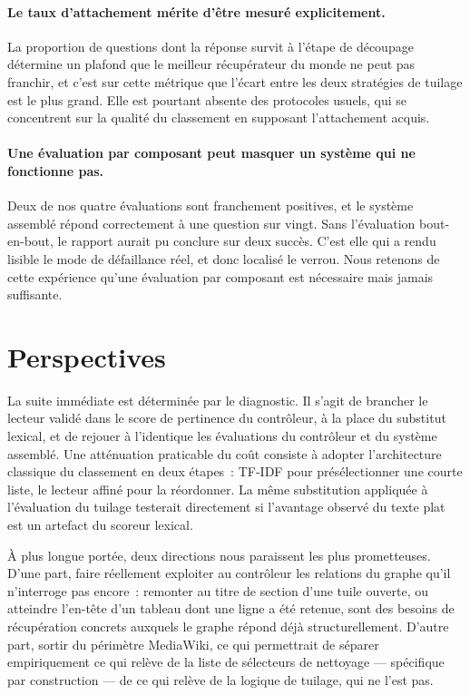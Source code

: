 \paragraph{Le taux d'attachement mérite d'être mesuré explicitement.} La
proportion de questions dont la réponse survit à l'étape de découpage détermine
un plafond que le meilleur récupérateur du monde ne peut pas franchir, et c'est
sur cette métrique que l'écart entre les deux stratégies de tuilage est le plus
grand. Elle est pourtant absente des protocoles usuels, qui se concentrent sur la
qualité du classement en supposant l'attachement acquis.

\paragraph{Une évaluation par composant peut masquer un système qui ne
fonctionne pas.} Deux de nos quatre évaluations sont franchement positives, et le
système assemblé répond correctement à une question sur vingt. Sans l'évaluation
bout-en-bout, le rapport aurait pu conclure sur deux succès. C'est elle qui a
rendu lisible le mode de défaillance réel, et donc localisé le verrou. Nous
retenons de cette expérience qu'une évaluation par composant est nécessaire mais
jamais suffisante.

\section*{Perspectives}

La suite immédiate est déterminée par le diagnostic. Il s'agit de brancher le
lecteur validé dans le score de pertinence du contrôleur, à la place du
substitut lexical, et de rejouer à l'identique les évaluations du contrôleur et du
système assemblé. Une atténuation praticable du coût consiste à adopter
l'architecture classique du classement en deux étapes~: TF-IDF pour
présélectionner une courte liste, le lecteur affiné pour la réordonner. La même
substitution appliquée à l'évaluation du tuilage testerait directement si
l'avantage observé du texte plat est un artefact du scoreur lexical.

À plus longue portée, deux directions nous paraissent les plus prometteuses.
D'une part, faire réellement exploiter au contrôleur les relations du graphe qu'il
n'interroge pas encore~: remonter au titre de section d'une tuile ouverte, ou
atteindre l'en-tête d'un tableau dont une ligne a été retenue, sont des besoins de
récupération concrets auxquels le graphe répond déjà structurellement. D'autre
part, sortir du périmètre MediaWiki, ce qui permettrait de séparer empiriquement
ce qui relève de la liste de sélecteurs de nettoyage --- spécifique par
construction --- de ce qui relève de la logique de tuilage, qui ne l'est pas.

